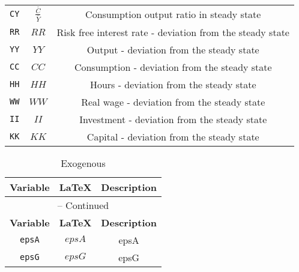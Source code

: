 \begin{center}
\begin{longtable}{ccc}
\texttt{CY} & $\frac{\bar{C}}{\bar{Y}}$ & Consumption output ratio in steady state\\
\texttt{RR} & $RR$ & Risk free interest rate - deviation from the steady state\\
\texttt{YY} & $YY$ & Output - deviation from the steady state\\
\texttt{CC} & $CC$ & Consumption - deviation from the steady state\\
\texttt{HH} & $HH$ & Hours - deviation from the steady state\\
\texttt{WW} & $WW$ & Real wage - deviation from the steady state\\
\texttt{II} & $II$ & Investment - deviation from the steady state\\
\texttt{KK} & $KK$ & Capital - deviation from the steady state\\
\hline%
\end{longtable}
\end{center}
\begin{center}
\begin{longtable}{ccc}
\caption{Exogenous}\\%
\hline%
\multicolumn{1}{c}{\textbf{Variable}} &
\multicolumn{1}{c}{\textbf{\LaTeX}} &
\multicolumn{1}{c}{\textbf{Description}}\\%
\hline\hline%
\endfirsthead
\multicolumn{3}{c}{{\tablename} \thetable{} -- Continued}\\%
\hline%
\multicolumn{1}{c}{\textbf{Variable}} &
\multicolumn{1}{c}{\textbf{\LaTeX}} &
\multicolumn{1}{c}{\textbf{Description}}\\%
\hline\hline%
\endhead
\texttt{epsA} & $epsA$ & epsA\\
\texttt{epsG} & $epsG$ & epsG\\
\hline%
\end{longtable}
\end{center}

